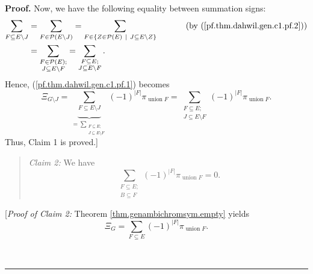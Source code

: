 \documentclass[numbers=enddot,12pt,final,onecolumn,notitlepage]{scrartcl}%
\theoremstyle{definition}
\newenvironment{statement}{\begin{quote}}{\end{quote}}
\newenvironment{proof}[1][Proof]{\noindent\textbf{#1.} }{\ \rule{0.5em}{0.5em}}
\newenvironment{verlong}{}{}
\newenvironment{vershort}{}{}
\let\sumnonlimits\sum
\renewcommand{\sum}{\sumnonlimits\limits}
\begin{document}
\begin{proof}
\begin{verlong}
Now, we have the following equality between summation signs:%
\begin{align*}
\sum_{F\subseteq E\setminus J}  &  =\sum_{F\in\mathcal{P}\left(  E\setminus
J\right)  }=\sum_{F\in\left\{  Z\in\mathcal{P}\left(  E\right)  \ \mid
\ J\subseteq E\setminus Z\right\}  }\ \ \ \ \ \ \ \ \ \ \left(  \text{by
(\ref{pf.thm.dahwil.gen.c1.pf.2})}\right) \\
&  =\sum_{\substack{F\in\mathcal{P}\left(  E\right)  ;\\J\subseteq E\setminus
F}}=\sum_{\substack{F\subseteq E;\\J\subseteq E\setminus F}}.
\end{align*}
Hence, (\ref{pf.thm.dahwil.gen.c1.pf.1}) becomes%
\[
\Xi_{G\setminus J}=\underbrace{\sum_{F\subseteq E\setminus J}}_{=\sum
_{\substack{F\subseteq E;\\J\subseteq E\setminus F}}}\left(  -1\right)
^{\left\vert F\right\vert }\pi_{\operatorname*{union}F}=\sum
_{\substack{F\subseteq E;\\J\subseteq E\setminus F}}\left(  -1\right)
^{\left\vert F\right\vert }\pi_{\operatorname*{union}F}.
\]
Thus, Claim 1 is proved.]
\end{verlong}

\begin{statement}
\textit{Claim 2:} We have
\begin{equation}
\sum_{\substack{F\subseteq E;\\B\subseteq F}}\left(  -1\right)  ^{\left\vert
F\right\vert }\pi_{\operatorname*{union}F}=0. \label{pf.thm.dahwil.gen.0=}%
\end{equation}

\end{statement}

\begin{vershort}
[\textit{Proof of Claim 2:} Theorem \ref{thm.genambichromsym.empty} yields%
\begin{equation}
\Xi_{G}=\sum_{F\subseteq E}\left(  -1\right)  ^{\left\vert F\right\vert }%
\pi_{\operatorname*{union}F}. \label{pf.thm.dahwil.gen.XiG.short.1}%
\end{equation}



\end{vershort}
\end{proof}
\end{document}

